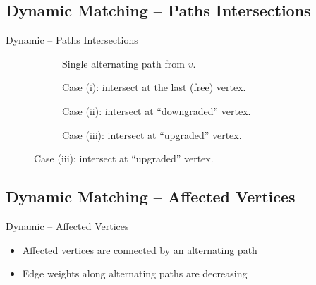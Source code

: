 \documentclass[10pt,titlepage,english,presentation]{beamer}
\begin{document}
\subsection{Dynamic Matching -- Paths Intersections}

\begin{frame}{Dynamic \suitor -- Paths Intersections}
\begin{figure}
\centering
\begin{subfigure}[t]{.4\textwidth}
\centering
\scalebox{.8}{

}
\caption*{Single alternating path from $v$.}
\end{subfigure}\hfill
\begin{subfigure}[t]{.4\textwidth}
\centering
\scalebox{.8}{

}
\caption*{Case (i): intersect at the last (free) vertex.}
\end{subfigure}

\begin{subfigure}[t]{.49\textwidth}
\centering
\scalebox{.8}{

}
\caption*{Case (ii): intersect at \enquote{downgraded} vertex.}
\end{subfigure}\hfill
\begin{subfigure}[t]{.49\textwidth}
\centering
\scalebox{.8}{

}
\caption*{Case (iii): intersect at \enquote{upgraded} vertex.}
\end{subfigure}
\end{figure}
\end{frame}

\subsection{Dynamic Matching -- Affected Vertices}

\begin{frame}[t]{Dynamic \suitor -- Affected Vertices}
\centering
\begin{figure}[H]
\centering

\end{figure}

\begin{itemize}
    \small
    \item<2> Affected vertices are connected by an alternating path
    \item<2> Edge weights along alternating paths are decreasing
\end{itemize}
\end{frame}
\end{document}
